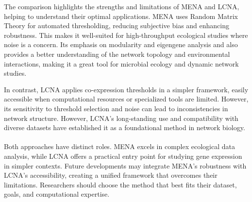 The comparison highlights the strengths and limitations of MENA and LCNA, helping to understand their optimal applications.
MENA uses Random Matrix Theory for automated thresholding, reducing subjective bias and enhancing robustness.
This makes it well-suited for high-throughput ecological studies where noise is a concern.
Its emphasis on modularity and eigengene analysis and also provides a better understanding of the network topology and environmental interactions, making it a great tool for microbial ecology and dynamic network studies.

\noindent In contrast, LCNA applies co-expression thresholds in a simpler framework, easily accessible when computational resources or specialized tools are limited.
However, its sensitivity to threshold selection and noise can lead to inconsistencies in network structure.
However, LCNA’s long-standing use and compatibility with diverse datasets have established it as a foundational method in network biology.
\\\\
Both approaches have distinct roles.
MENA excels in complex ecological data analysis, while LCNA offers a practical entry point for studying gene expression in simpler contexts.
Future developments may integrate MENA’s robustness with LCNA’s accessibility, creating a unified framework that overcomes their limitations.
Researchers should choose the method that best fits their dataset, goals, and computational expertise.

